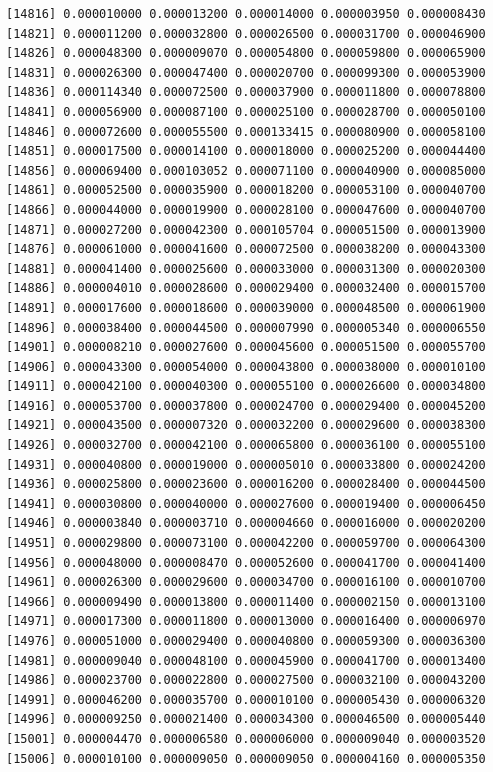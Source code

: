 \documentclass[]{article}
\begin{document}
\begin{verbatim}
[14816] 0.000010000 0.000013200 0.000014000 0.000003950 0.000008430
[14821] 0.000011200 0.000032800 0.000026500 0.000031700 0.000046900
[14826] 0.000048300 0.000009070 0.000054800 0.000059800 0.000065900
[14831] 0.000026300 0.000047400 0.000020700 0.000099300 0.000053900
[14836] 0.000114340 0.000072500 0.000037900 0.000011800 0.000078800
[14841] 0.000056900 0.000087100 0.000025100 0.000028700 0.000050100
[14846] 0.000072600 0.000055500 0.000133415 0.000080900 0.000058100
[14851] 0.000017500 0.000014100 0.000018000 0.000025200 0.000044400
[14856] 0.000069400 0.000103052 0.000071100 0.000040900 0.000085000
[14861] 0.000052500 0.000035900 0.000018200 0.000053100 0.000040700
[14866] 0.000044000 0.000019900 0.000028100 0.000047600 0.000040700
[14871] 0.000027200 0.000042300 0.000105704 0.000051500 0.000013900
[14876] 0.000061000 0.000041600 0.000072500 0.000038200 0.000043300
[14881] 0.000041400 0.000025600 0.000033000 0.000031300 0.000020300
[14886] 0.000004010 0.000028600 0.000029400 0.000032400 0.000015700
[14891] 0.000017600 0.000018600 0.000039000 0.000048500 0.000061900
[14896] 0.000038400 0.000044500 0.000007990 0.000005340 0.000006550
[14901] 0.000008210 0.000027600 0.000045600 0.000051500 0.000055700
[14906] 0.000043300 0.000054000 0.000043800 0.000038000 0.000010100
[14911] 0.000042100 0.000040300 0.000055100 0.000026600 0.000034800
[14916] 0.000053700 0.000037800 0.000024700 0.000029400 0.000045200
[14921] 0.000043500 0.000007320 0.000032200 0.000029600 0.000038300
[14926] 0.000032700 0.000042100 0.000065800 0.000036100 0.000055100
[14931] 0.000040800 0.000019000 0.000005010 0.000033800 0.000024200
[14936] 0.000025800 0.000023600 0.000016200 0.000028400 0.000044500
[14941] 0.000030800 0.000040000 0.000027600 0.000019400 0.000006450
[14946] 0.000003840 0.000003710 0.000004660 0.000016000 0.000020200
[14951] 0.000029800 0.000073100 0.000042200 0.000059700 0.000064300
[14956] 0.000048000 0.000008470 0.000052600 0.000041700 0.000041400
[14961] 0.000026300 0.000029600 0.000034700 0.000016100 0.000010700
[14966] 0.000009490 0.000013800 0.000011400 0.000002150 0.000013100
[14971] 0.000017300 0.000011800 0.000013000 0.000016400 0.000006970
[14976] 0.000051000 0.000029400 0.000040800 0.000059300 0.000036300
[14981] 0.000009040 0.000048100 0.000045900 0.000041700 0.000013400
[14986] 0.000023700 0.000022800 0.000027500 0.000032100 0.000043200
[14991] 0.000046200 0.000035700 0.000010100 0.000005430 0.000006320
[14996] 0.000009250 0.000021400 0.000034300 0.000046500 0.000005440
[15001] 0.000004470 0.000006580 0.000006000 0.000009040 0.000003520
[15006] 0.000010100 0.000009050 0.000009050 0.000004160 0.000005350

\end{verbatim}
\end{document}
